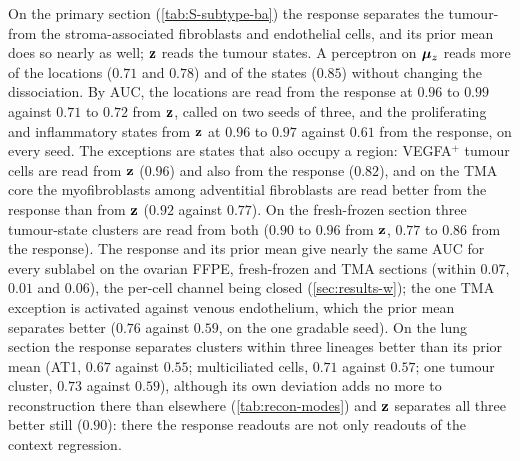 On the primary section (\cref{tab:S-subtype-ba}) the response separates the tumour- from the stroma-associated fibroblasts and endothelial cells, and its prior mean does so nearly as well; $\mathbf{z}$ reads the tumour states. A perceptron on $\boldsymbol{\mu}_z$ reads more of the locations ($0.71$ and $0.78$) and of the states ($0.85$) without changing the dissociation. By AUC, the locations are read from the response at $0.96$ to $0.99$ against $0.71$ to $0.72$ from $\mathbf{z}$, called on two seeds of three, and the proliferating and inflammatory states from $\mathbf{z}$ at $0.96$ to $0.97$ against $0.61$ from the response, on every seed. The exceptions are states that also occupy a region: VEGFA$^+$ tumour cells are read from $\mathbf{z}$ ($0.96$) and also from the response ($0.82$), and on the TMA core the myofibroblasts among adventitial fibroblasts are read better from the response than from $\mathbf{z}$ ($0.92$ against $0.77$). On the fresh-frozen section three tumour-state clusters are read from both ($0.90$ to $0.96$ from $\mathbf{z}$, $0.77$ to $0.86$ from the response).
The response and its prior mean give nearly the same AUC for every sublabel on the ovarian FFPE, fresh-frozen and TMA sections (within $0.07$, $0.01$ and $0.06$), the per-cell channel being closed (\cref{sec:results-w}); the one TMA exception is activated against venous endothelium, which the prior mean separates better ($0.76$ against $0.59$, on the one gradable seed). On the lung section the response separates clusters within three lineages better than its prior mean (AT1, $0.67$ against $0.55$; multiciliated cells, $0.71$ against $0.57$; one tumour cluster, $0.73$ against $0.59$), although its own deviation adds no more to reconstruction there than elsewhere (\cref{tab:recon-modes}) and $\mathbf{z}$ separates all three better still ($0.90$): there the response readouts are not only readouts of the context regression.

